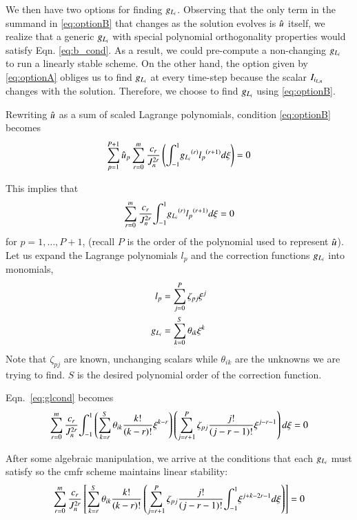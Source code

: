 We then have two options for finding $\gL$. Observing that the only term in the summand in \eqref{eq:optionB} that changes as the solution evolves is $\urd$ itself, we realize that a generic $\gL$ with special polynomial orthogonality properties would satisfy Eqn. \eqref{eq:b_cond}. As a result, we could pre-compute a non-changing $\gL$ to run a linearly stable scheme. On the other hand, the option given by \eqref{eq:optionA} obliges us to find
$\gL$ at every time-step because the scalar $\IL[i]$ changes with the solution. Therefore, we choose to find
$\gL$ using \eqref{eq:optionB}. %


Rewriting $\urd$ as a sum of scaled Lagrange polynomials, condition \eqref{eq:optionB} becomes
\begin{equation}
 \label{eq:glcond1}  \sum^{P+1}_{p=1} \urd_p \sum^m_{r=0} \frac{c_r}{J^{2r}_n} \l(\ioo \dD{\gL}{r}
\dD{l_p}{r+1} d\xi \r) = 0
\end{equation}

This implies that
\begin{equation}\label{eq:glcond}
\sum^m_{r=0}\frac{c_r}{J^{2r}_n} \ioo \dD{\gL}{r} \dD{l_p}{r+1} d\xi = 0 
\end{equation}
for $p=1,\ldots, P+1$, (recall $P$ is the order of the polynomial used to represent $\urd$).
Let us expand the Lagrange polynomials $l_p$ and the correction functions $\gL$ into monomials,
\begin{equation}
\begin{split}
 l_p&=\sum^P_{j=0} \zeta_{pj} \xi^j\\
 \gL &= \sum^S_{k=0} \theta_{ik} \xi^k 
 \end{split}
\end{equation}
Note that $\zeta_{pj}$ are known, unchanging scalars while $\theta_{ik}$ are the unknowns we are trying to find. $S$ is the desired polynomial order of the correction function.

Eqn.~\eqref{eq:glcond} becomes
 \begin{equation*}
\sum^m_{r=0} \frac{c_r}{J^{2r}_n} \ioo 
\l( \sum^S_{k=r} \theta_{ik} \frac{k!}{(k-r)!} 
\xi^{k-r}  \r)
\l(
\sum^P_{j=r+1}\zeta_{pj}\frac{j!}{(j-r-1)!}  \xi^{j-r-1} \r)
d\xi =0
\end{equation*}

After some algebraic manipulation, we arrive at the conditions that each $\gL$ must satisfy so the \gls{cmfr} scheme maintains linear stability:
\begin{equation}
 \label{eq:gcond}
\sum^m_{r=0} \frac{c_r}{J^{2r}_n}  
\l[ \sum^S_{k=r} \theta_{ik} \frac{k!}{(k-r)!} 
\l(
\sum^P_{j=r+1}\zeta_{pj}\frac{j!}{(j-r-1)!}  \ioo \xi^{j+k-2r-1} d\xi\r)\r]
 =0
\end{equation}

